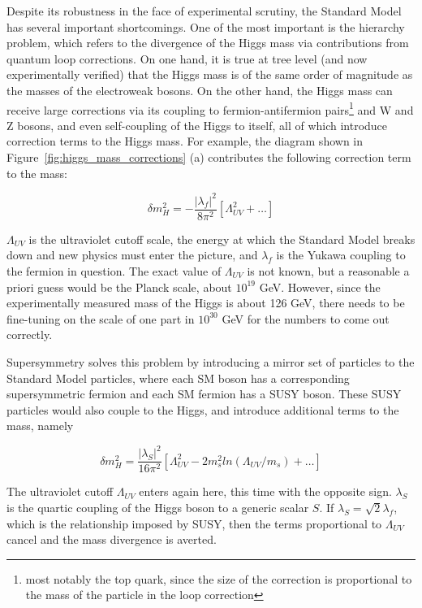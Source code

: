 Despite its robustness in the face of experimental scrutiny, the Standard Model has several 
important shortcomings.  One of the most important is the hierarchy problem, which refers 
to the divergence of the Higgs mass via contributions from quantum loop corrections.
On one hand, it is true at tree level (and now experimentally verified) that the Higgs 
mass is of the same order of magnitude as the masses of the electroweak bosons.  
On the other hand, the Higgs mass can receive large corrections via its coupling
to fermion-antifermion 
pairs\footnote{most notably the top quark, since the size of the correction is proportional
to the mass of the particle in the loop correction} and W and Z bosons, and
even self-coupling of the Higgs to itself, 
all of which introduce correction terms to the Higgs mass.  For example, the 
diagram shown in Figure~\ref{fig:higgs_mass_corrections} (a) 
contributes the following correction term to the mass:

\begin{equation}
	\delta m_H^2 = - \frac{|\lambda_f |^2}{8\pi^2}[\Lambda_{UV}^2+\ldots]
\end{equation}

$\Lambda_{UV}$ is the ultraviolet cutoff scale, the energy at which 
the Standard Model breaks down and new physics must enter the picture, and 
$\lambda_f$ is the Yukawa coupling to the fermion in question.  The 
exact value of $\Lambda_{UV}$ is not known, but a reasonable 
a priori guess would be the Planck scale, about $10^{19}$ 
GeV.  However, since the experimentally measured mass of the Higgs is about 126 
GeV, there needs to be fine-tuning on the scale of one part in  
$10^{30}$ GeV for the numbers to come out correctly.

Supersymmetry solves this problem by introducing a mirror set of particles to the Standard Model 
particles, where each SM boson has a corresponding supersymmetric fermion and each SM fermion 
has a SUSY boson.  These SUSY particles would also couple to the Higgs, 
and introduce additional terms to the mass, namely

\begin{equation}
	\delta m_H^2 = \frac{|\lambda_S |^2}{16\pi^2}[\Lambda_{UV}^2-2m_s^2ln(\Lambda_{UV}/m_s)+\ldots]
\end{equation}

The ultraviolet cutoff $\Lambda_{UV}$ enters again here, this time with 
the opposite sign.  $\lambda_S$ is the quartic coupling of the Higgs boson
to a generic scalar $S$.  If $\lambda_S = \sqrt{2}\lambda_f$, which is the relationship 
imposed by SUSY, then the terms proportional to $\Lambda_{UV}$ cancel and the
mass divergence is averted\cite{ellis,martin}.

